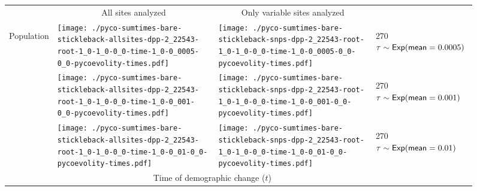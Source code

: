 \documentclass[border=10pt,varwidth=30cm]{standalone}
\begin{document}
\begin{figure}
    \centering
    \begin{tabular}{@{}llll@{}}
        & \multicolumn{1}{c}{\large All sites analyzed} & \multicolumn{1}{c}{\large Only variable sites analyzed} & \\[1ex]
        \multirow{2}{*}[-4em]{\begin{sideways}\large Population\end{sideways}}
        & \texttt{[image: ./pyco-sumtimes-bare-stickleback-allsites-dpp-2\_22543-root-1\_0-1\_0-0\_0-time-1\_0-0\_0005-0\_0-pycoevolity-times.pdf]}
        & \texttt{[image: ./pyco-sumtimes-bare-stickleback-snps-dpp-2\_22543-root-1\_0-1\_0-0\_0-time-1\_0-0\_0005-0\_0-pycoevolity-times.pdf]}
        & \multirow{1}{*}[11.5em]{\begin{rotate}{270}$\tau \sim \textrm{\sffamily Exp}(\textrm{\sffamily mean}=0.0005)$\end{rotate}} \\
        & \texttt{[image: ./pyco-sumtimes-bare-stickleback-allsites-dpp-2\_22543-root-1\_0-1\_0-0\_0-time-1\_0-0\_001-0\_0-pycoevolity-times.pdf]}
        & \texttt{[image: ./pyco-sumtimes-bare-stickleback-snps-dpp-2\_22543-root-1\_0-1\_0-0\_0-time-1\_0-0\_001-0\_0-pycoevolity-times.pdf]}
        & \multirow{1}{*}[11em]{\begin{rotate}{270}$\tau \sim \textrm{\sffamily Exp}(\textrm{\sffamily mean}=0.001)$\end{rotate}} \\
        & \texttt{[image: ./pyco-sumtimes-bare-stickleback-allsites-dpp-2\_22543-root-1\_0-1\_0-0\_0-time-1\_0-0\_01-0\_0-pycoevolity-times.pdf]}
        & \texttt{[image: ./pyco-sumtimes-bare-stickleback-snps-dpp-2\_22543-root-1\_0-1\_0-0\_0-time-1\_0-0\_01-0\_0-pycoevolity-times.pdf]}
        & \multirow{1}{*}[11em]{\begin{rotate}{270}$\tau \sim \textrm{\sffamily Exp}(\textrm{\sffamily mean}=0.01)$\end{rotate}} \\
        & \multicolumn{2}{c}{\large Time of demographic change ($t$)} & 
    \end{tabular}
\end{figure}
\end{document}
